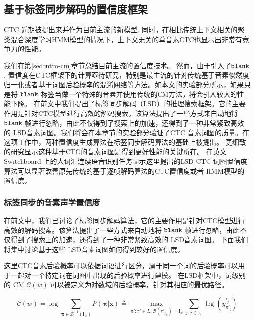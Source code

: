 \subsection{基于标签同步解码的置信度框架}
\label{chap:unify-confidence}

CTC\cite{graves2006connectionist} 近期被提出来并作为目前主流的新模型\cite{fernandez2008phoneme}\cite{sainath2015acoustic}\cite{amodei2015deep}\cite{sak2015fast}.
同时，在相比传统上下文相关的聚类混合深度学习HMM模型\cite{sak2015fast}\cite{miao2015eesen}\cite{miao2016ctc}\cite{mcgraw2016personalized}的情况下，上下文无关的单音素CTC也显示出非常有竞争力的性能。

我们在第\ref{sec:intro-cm}章节总结目前主流的置信度技术。
然而，由于引入了$\tt blank$, 置信度在CTC框架下的计算亟待研究，特别是最主流的针对传统基于音素似然度归一化或者基于词图后验概率的混淆网络等方法。如本文的实验部分所示，如果只是将 $\tt blank$ 标签当做一个特殊的音素并使用传统的CM方法，将会引入较大的性能下降。
在前文中我们提出了标签同步解码（LSD）的推理搜索框架。它的主要作用是针对CTC模型进行高效的解码搜索。该算法提出了一些方式来自动地将 $\tt blank$ 帧进行忽略，由此不仅得到了搜索上的加速，还得到了一种非常紧致高效的 LSD音素词图。我们将会在本章节的实验部分验证了CTC 音素词图的质量。在这项工作中，两种置信度生成算法在标签同步解码算法的基础上被提出。
更细致的研究显示这种基于CTC的音素词图是得到更好性能的关键所在。
在英文Switchboard 上的大词汇连续语音识别任务显示这里提出的LSD CTC 词图置信度算法可以显著改善原先传统的基于逐帧解码算法的CTC置信度或者 HMM模型的置信度。


\subsubsection{标签同步的音素声学置信度}
\label{sec:psd-ac-conf}

在前文中，我们已讨论了标签同步解码算法，它的主要作用是针对CTC模型进行高效的解码搜索。该算法提出了一些方式来自动地将 $\tt blank$ 帧进行忽略，由此不仅得到了搜索上的加速，还得到了一种非常紧致高效的 LSD音素词图。
下面我们将集中讨论基于这些 LSD音素词图如何得到较好的置信度。

这里CTC音素后验概率可以依据词语进行区分，属于同一个词的后验概率可以用于一起对一个特定词在词图中出现的后验概率进行建模。
在LSD框架中，词级别的 CM $\mathcal{C}(w)$ 可以被定义为对数域的后验概率，针对其相应的最优路径。


     \begin{equation}\label{eq:psd-ac-conf1}
        \mathcal{C}(w)  =
         \log\!\!\!\!\!\!\sum_{\bm\pi \in \mathcal{B}^{-1}(\mathbf{l}_w)}{\!\!\!\!\!\!P(\bm\pi|\mathbf{x})}
        \triangleq
   \!\!\!\!\!\!\mathop{\max}\limits
       _{\!\!\!\!\pi':\pi' \in L, \mathcal{B}(\pi'_{\mathbf{j}_w})       =       {\mathbf{l}}_w}
   \sum_{j:j\in \mathbf{j}_w}
   \log({y^{t_{j}}_{\pi'_{j}}})
     \end{equation}

